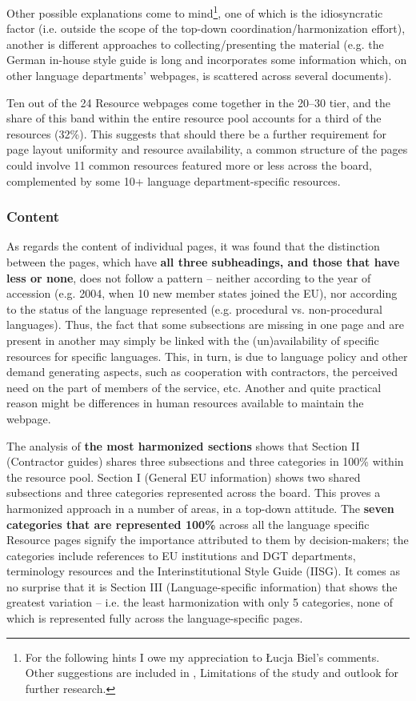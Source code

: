 \documentclass[output=paper]{langsci/langscibook}
\begin{document}
Other possible explanations come to mind\footnote{For the following hints I owe my appreciation to Łucja Biel’s comments. Other suggestions are included in , Limitations of the study and outlook for further research.}, one of which is the idiosyncratic factor (i.e. outside the scope of the top-down coordination/harmonization effort), another is different approaches to collecting/presenting the material (e.g. the German in-house style guide is long and incorporates some information which, on other language departments’ webpages, is scattered across several documents). 

Ten out of the 24 Resource webpages come together in the 20–30 tier, and the share of this band within the entire resource pool accounts for a third of the resources (32\%). This suggests that should there be a further requirement for page layout uniformity and resource availability, a common structure of the pages could involve 11 common resources featured more or less across the board, complemented by some 10+ language department-specific resources. 

\subsubsection{Content}

As regards the content of individual pages, it was found that the distinction between the pages, which have \textbf{all three subheadings, and those that have less or none}, does not follow a pattern – neither according to the year of accession (e.g. 2004, when 10 new member states joined the EU), nor according to the status of the language represented (e.g. procedural vs. non-procedural languages). Thus, the fact that some subsections are missing in one page and are present in another may simply be linked with the (un)availability of specific resources for specific languages. This, in turn, is due to language policy and other demand generating aspects, such as cooperation with contractors, the perceived need on the part of members of the service, etc. Another and quite practical reason might be differences in human resources available to maintain the webpage.

The analysis of \textbf{the most harmonized sections} shows that Section II (Contractor guides) shares three subsections and three categories in 100\% within the resource pool. Section I (General EU information) shows two shared subsections and three categories represented across the board. This proves a harmonized approach in a number of areas, in a top-down attitude. The \textbf{seven categories that are represented 100\%} across all the language specific Resource pages signify the importance attributed to them by decision-makers; the categories include references to EU institutions and DGT departments, terminology resources and the Interinstitutional Style Guide (IISG). It comes as no surprise that it is Section III (Language-specific information) that shows the greatest variation – i.e. the least harmonization with only 5 categories, none of which is represented fully across the language-specific pages.
\end{document}
